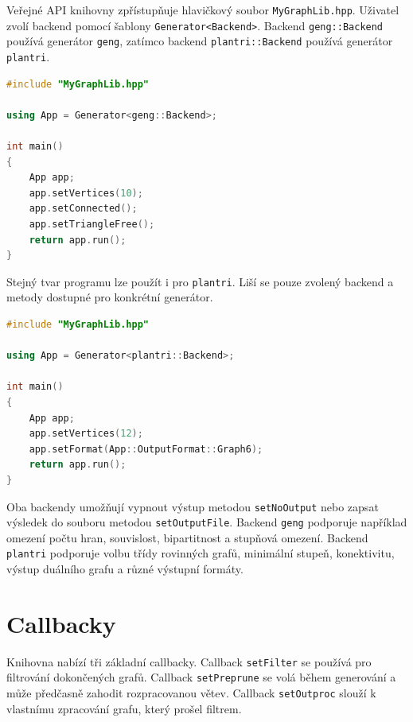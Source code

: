 Veřejné API knihovny zpřístupňuje hlavičkový soubor \texttt{MyGraphLib.hpp}.
Uživatel zvolí backend pomocí šablony \texttt{Generator<Backend>}. Backend
\texttt{geng::Backend} používá generátor \texttt{geng}, zatímco backend
\texttt{plantri::Backend} používá generátor \texttt{plantri}.

\begin{listing}
\begin{lstlisting}[language=C++]
#include "MyGraphLib.hpp"

using App = Generator<geng::Backend>;

int main()
{
    App app;
    app.setVertices(10);
    app.setConnected();
    app.setTriangleFree();
    return app.run();
}
\end{lstlisting}
\caption{Jednoduché použití backendu \texttt{geng}.}
\label{lst:howto-basic-geng}
\end{listing}

Stejný tvar programu lze použít i pro \texttt{plantri}. Liší se pouze zvolený
backend a metody dostupné pro konkrétní generátor.

\begin{listing}
\begin{lstlisting}[language=C++]
#include "MyGraphLib.hpp"

using App = Generator<plantri::Backend>;

int main()
{
    App app;
    app.setVertices(12);
    app.setFormat(App::OutputFormat::Graph6);
    return app.run();
}
\end{lstlisting}
\caption{Jednoduché použití backendu \texttt{plantri}.}
\label{lst:howto-basic-plantri}
\end{listing}

Oba backendy umožňují vypnout výstup metodou \texttt{setNoOutput} nebo zapsat
výsledek do souboru metodou \texttt{setOutputFile}. Backend \texttt{geng}
podporuje například omezení počtu hran, souvislost, bipartitnost a stupňová
omezení. Backend \texttt{plantri} podporuje volbu třídy rovinných grafů,
minimální stupeň, konektivitu, výstup duálního grafu a různé výstupní formáty.

\section{Callbacky}

Knihovna nabízí tři základní callbacky. Callback \texttt{setFilter} se používá
pro filtrování dokončených grafů. Callback \texttt{setPreprune} se volá během
generování a může předčasně zahodit rozpracovanou větev. Callback
\texttt{setOutproc} slouží k vlastnímu zpracování grafu, který prošel filtrem.

